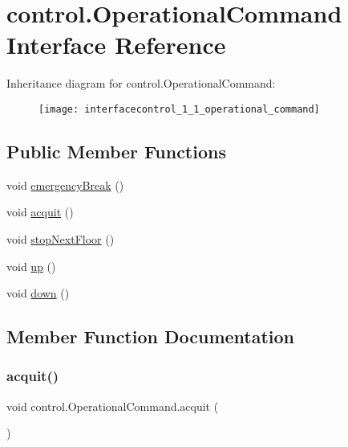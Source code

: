 \hypertarget{interfacecontrol_1_1_operational_command}{}\section{control.\+Operational\+Command Interface Reference}
\label{interfacecontrol_1_1_operational_command}
Inheritance diagram for control.\+Operational\+Command\+:\begin{figure}[H]
\begin{center}
\leavevmode
\texttt{[image: interfacecontrol\_1\_1\_operational\_command]}
\end{center}
\end{figure}
\subsection*{Public Member Functions}
\begin{DoxyCompactItemize}
\item 
void \mbox{\hyperlink{interfacecontrol_1_1_operational_command_a63858b26e71770bb4ae232277d54b8a6}{emergency\+Break}} ()
\item 
void \mbox{\hyperlink{interfacecontrol_1_1_operational_command_ab48776483b91f60855a69d7671e02446}{acquit}} ()
\item 
void \mbox{\hyperlink{interfacecontrol_1_1_operational_command_a148c09334384843727fb7b1665252ff1}{stop\+Next\+Floor}} ()
\item 
void \mbox{\hyperlink{interfacecontrol_1_1_operational_command_a23231ea40f8bf5cd07b864238f258b5f}{up}} ()
\item 
void \mbox{\hyperlink{interfacecontrol_1_1_operational_command_a3d1ecf1ec7ad55a3f3e02d2fc9df7e18}{down}} ()
\end{DoxyCompactItemize}


\subsection{Member Function Documentation}
\mbox{\label{interfacecontrol_1_1_operational_command_ab48776483b91f60855a69d7671e02446}} 
\subsubsection{\texorpdfstring{acquit()}{acquit()}}
{\footnotesize\ttfamily void control.\+Operational\+Command.\+acquit (\begin{DoxyParamCaption}{ }\end{DoxyParamCaption})}



